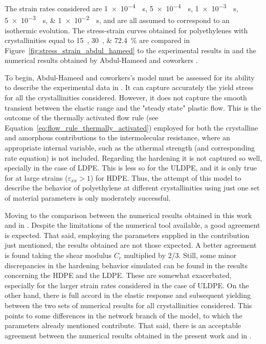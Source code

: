 The strain rates considered are \SIlist{1e-4;5e-4;1e-3;5e-3;1e-2}{\per\second}, and are all assumed to correspond to an isothermic evolution.
The stress-strain curves obtained for polyethylenes with crystallinities equal to \SIlist{15;30;72.4}{}\% are compared in Figure~\ref{fig:stress_strain_abdul_hameed} to the experimental results in \cite{ayoubEffectsCrystalContent2011} and the numerical results obtained by Abdul-Hameed and coworkers \citep{abdul-hameedTwophaseHyperelasticviscoplasticConstitutive2014}.

To begin, Abdul-Hameed and coworkers's model \citep{abdul-hameedTwophaseHyperelasticviscoplasticConstitutive2014} must be assessed for its ability to describe the experimental data in \cite{ayoubEffectsCrystalContent2011}.
It can capture accurately the yield stress for all the crystallinities considered.
However, it does not capture the smooth transient between the elastic range and the "steady state" plastic flow.
This is the outcome of the thermally activated flow rule (see Equation~\eqref{eq:flow_rule_thermally_activated}) employed for both the crystalline and amorphous contributions to the intermolecular resistance, where an appropriate internal variable, such as the athermal strength (and corresponding rate equation) is not included.
Regarding the hardening it is not captured so well, specially in the case of LDPE.
This is less so for the ULDPE, and it is only true for at large strains ($\varepsilon_{xx}>1$) for HDPE.
Thus, the attempt of this model to describe the behavior of polyethylene at different crystallinities using just one set of material parameters is only moderately successful.

Moving to the comparison between the numerical results obtained in this work and in \cite{abdul-hameedTwophaseHyperelasticviscoplasticConstitutive2014}.
Despite the limitations of the numerical tool available, a good agreement is expected.
That said, employing the parameters supplied in the contribution just mentioned, the results obtained are not those expected.
A better agreement is found taking the shear modulus $C_c$ multiplied by 2/3.
Still, some minor discrepancies in the hardening behavior simulated can be found in the results concerning the HDPE and the LDPE.
These are somewhat exacerbated, especially for the larger strain rates considered in the case of ULDPE.
On the other hand, there is full accord in the elastic response and subsequent yielding between the two sets of numerical results for all crystallinities considered.
This points to some differences in the network branch of the model, to which the parameters already mentioned contribute.
That said, there is an acceptable agreement between the numerical results obtained in the present work and in \cite{abdul-hameedTwophaseHyperelasticviscoplasticConstitutive2014}.

